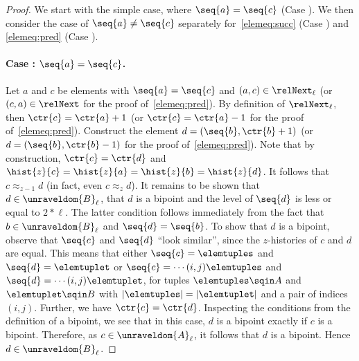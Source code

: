 \begin{proof}
  We start with the simple case, where $\seq{a} = \seq{c}$ (Case ).
  We then consider the case of $\seq{a} \ne \seq{c}$ separately for~\ref{elemeq:succ} (Case ) and \ref{elemeq:pred} (Case ).

  \paragraph{Case : $\seq{a} = \seq{c}$.}
  Let $a$ and $c$ be elements with $\seq{a} = \seq{c}$ and $(a,c) \in \relNext_{\ell}$ (or $(c,a) \in \relNext$ for the proof of~\ref{elemeq:pred}).
  By definition of $\relNext_{\ell}$, then $\ctr{c} = \ctr{a} + 1$ (or $\ctr{c} = \ctr{a} - 1$ for the proof of~\ref{elemeq:pred}).
  Construct the element $d = (\seq{b}, \ctr{b} + 1)$ (or $d = (\seq{b}, \ctr{b} - 1)$ for the proof of~\ref{elemeq:pred}).
  Note that by construction, $\ctr{c} = \ctr{d}$ and $\hist{z}{c} = \hist{z}{a} = \hist{z}{b} = \hist{z}{d}$.
  It follows that $c \approx_{z-1} d$ (in fact, even $c \approx_{z} d$).
  It remains to be shown that $d \in \unraveldom{B}_{\ell}$, \ie{} that $d$ is a bipoint and the level of $\seq{d}$ is less or equal to $2 * \ell$.
  The latter condition follows immediately from the fact that $b \in \unraveldom{B}_{\ell}$ and $\seq{d} = \seq{b}$.
  To show that $d$ is a bipoint, observe that $\seq{c}$ and $\seq{d}$ ``look similar'', since the $z$-histories of $c$ and $d$ are equal.
  This means that either $\seq{c} = \elemtuples$ and $\seq{d} = \elemtuplet$ or $\seq{c} = \cdots(i,j)\elemtuples$ and $\seq{d} = \cdots(i,j)\elemtuplet$, for tuples $\elemtuples \sqin A$ and $\elemtuplet \sqin B$ with $|\elemtuples| = |\elemtuplet|$ and a pair of indices $(i,j)$.
  Further, we have $\ctr{c} = \ctr{d}$.
  Inspecting the conditions from the definition of a bipoint, we see that in this case, $d$ is a bipoint exactly if $c$ is a bipoint.
  Therefore, as $c \in \unraveldom{A}_{\ell}$, it follows that $d$ is a bipoint.
  Hence $d \in \unraveldom{B}_{\ell}$.


\end{proof}
